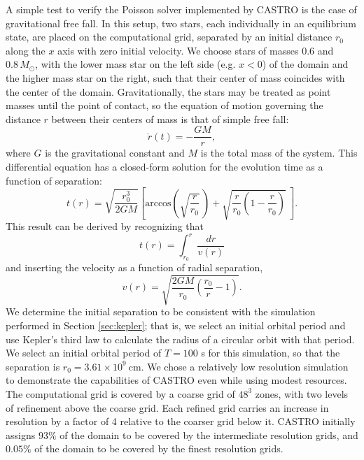 \documentclass[12pt,preprint]{aastex}
\begin{document}
A simple test to verify the Poisson solver implemented by CASTRO is
the case of gravitational free fall. In this setup, two stars, each
individually in an equilibrium state, are placed on the computational
grid, separated by an initial distance $r_0$ along the $x$ axis with
zero initial velocity. We choose stars of masses $0.6$ and $0.8\,
M_\odot$, with the lower mass star on the left side (e.g. $x < 0$) of
the domain and the higher mass star on the right, such that their
center of mass coincides with the center of the
domain. Gravitationally, the stars may be treated as point masses
until the point of contact, so the equation of motion governing the
distance $r$ between their centers of mass is that of simple free
fall:
\begin{equation}
  \ddot{r}(t) = - \frac{GM}{r},
\end{equation}
where $G$ is the gravitational constant and $M$ is the total mass of
the system. This differential equation has a closed-form solution for
the evolution time as a function of separation:
\begin{equation}
  t(r) = \sqrt{\frac{r_0^3}{2GM}} \left[ \text{arccos}\left(\sqrt{\frac{r}{r_0}}\,\right) + \sqrt{\frac{r}{r_0} \left(1 - \frac{r}{r_0}\right)}\ \right]. \label{analyticalFreeFall}
\end{equation}
This result can be derived by recognizing that
\begin{equation}
  t(r) = \int_{r_0}^r \frac{dr}{v(r)}
\end{equation}
and inserting the velocity as a function of radial separation,
\begin{equation}
  v(r) = \sqrt{\frac{2GM}{r_0}\left(\frac{r_0}{r} - 1\right)}.
\end{equation}
We determine the initial separation to be consistent with the
simulation performed in Section \ref{sec:kepler}; that is, we select
an initial orbital period and use Kepler's third law to calculate the
radius of a circular orbit with that period. We select an initial
orbital period of $T = 100$ s for this simulation, so that the separation is 
$r_0 = 3.61 \times 10^{9}\ \text{cm}$.
We chose a relatively low resolution simulation to demonstrate the
capabilities of CASTRO even while using modest resources. The
computational grid is covered by a coarse grid of $48^3$ zones, with
two levels of refinement above the coarse grid. Each refined grid
carries an increase in resolution by a factor of 4 relative to the
coarser grid below it. CASTRO initially assigns $93\%$ of the domain
to be covered by the intermediate resolution grids, and $0.05\%$ of
the domain to be covered by the finest resolution grids.
\end{document}
